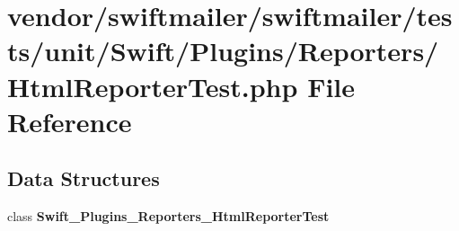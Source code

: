 \section{vendor/swiftmailer/swiftmailer/tests/unit/\+Swift/\+Plugins/\+Reporters/\+Html\+Reporter\+Test.php File Reference}
\label{_html_reporter_test_8php}
\subsection*{Data Structures}
\begin{DoxyCompactItemize}
\item 
class {\bf Swift\+\_\+\+Plugins\+\_\+\+Reporters\+\_\+\+Html\+Reporter\+Test}
\end{DoxyCompactItemize}
